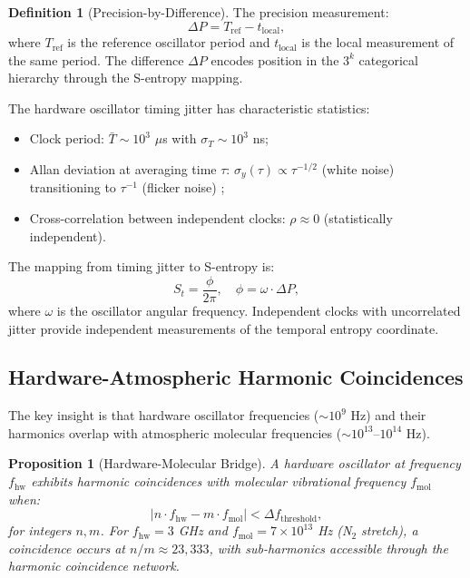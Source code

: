 \documentclass[twocolumn,10pt]{article}
\newtheorem{proposition}[theorem]{Proposition}
\theoremstyle{definition}
\newtheorem{definition}[theorem]{Definition}
\newcommand{\St}{S_t}
\begin{document}
\begin{definition}[Precision-by-Difference]\label{def:precision_by_diff}
The precision measurement:
\begin{equation}\label{eq:precision_by_diff}
    \Delta P = T_{\mathrm{ref}} - t_{\mathrm{local}},
\end{equation}
where $T_{\mathrm{ref}}$ is the reference oscillator period and $t_{\mathrm{local}}$ is the local measurement of the same period. The difference $\Delta P$ encodes position in the $3^k$ categorical hierarchy through the S-entropy mapping.
\end{definition}

The hardware oscillator timing jitter has characteristic statistics:
\begin{itemize}[nosep]
    \item Clock period: $\bar{T} \sim 10^3$ $\mu$s with $\sigma_T \sim 10^3$ ns;
    \item Allan deviation at averaging time $\tau$: $\sigma_y(\tau) \propto \tau^{-1/2}$ (white noise) transitioning to $\tau^{-1}$ (flicker noise) \citep{Allan1966};
    \item Cross-correlation between independent clocks: $\rho \approx 0$ (statistically independent).
\end{itemize}

The mapping from timing jitter to S-entropy is:
\begin{equation}\label{eq:jitter_to_sentropy}
    \St = \frac{\phi}{2\pi}, \quad \phi = \omega \cdot \Delta P,
\end{equation}
where $\omega$ is the oscillator angular frequency. Independent clocks with uncorrelated jitter provide independent measurements of the temporal entropy coordinate.

\subsection{Hardware-Atmospheric Harmonic Coincidences}

The key insight is that hardware oscillator frequencies ($\sim 10^9$ Hz) and their harmonics overlap with atmospheric molecular frequencies ($\sim 10^{13}$--$10^{14}$ Hz).

\begin{proposition}[Hardware-Molecular Bridge]\label{prop:hw_bridge}
A hardware oscillator at frequency $f_{\mathrm{hw}}$ exhibits harmonic coincidences with molecular vibrational frequency $f_{\mathrm{mol}}$ when:
\begin{equation}\label{eq:hw_mol_coincidence}
    |n \cdot f_{\mathrm{hw}} - m \cdot f_{\mathrm{mol}}| < \Delta f_{\mathrm{threshold}},
\end{equation}
for integers $n, m$. For $f_{\mathrm{hw}} = 3$ GHz and $f_{\mathrm{mol}} = 7 \times 10^{13}$ Hz (N$_2$ stretch), a coincidence occurs at $n/m \approx 23{,}333$, with sub-harmonics accessible through the harmonic coincidence network.
\end{proposition}
\end{document}
